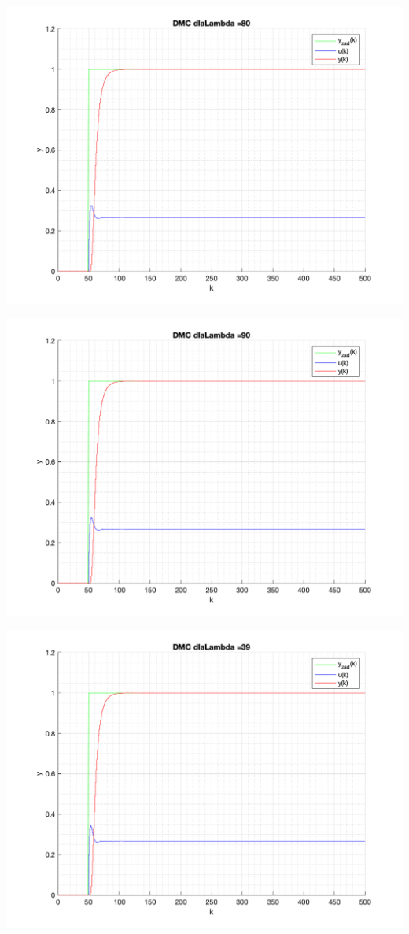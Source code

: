 \documentclass[a4paper, 11pt]{article}
\begin{document}
\begin{enumerate}
 \includegraphics[width=\linewidth]{./ModelsP4_Lambda/P4_DMC_Lambda_80_png.png} 
 
 \includegraphics[width=\linewidth]{./ModelsP4_Lambda/P4_DMC_Lambda_90_png.png} 
 
 \includegraphics[width=\linewidth]{./ModelsP4_Lambda/P4_DMC_Lambda_39_png.png} 
 

\end{enumerate}
\end{document}
